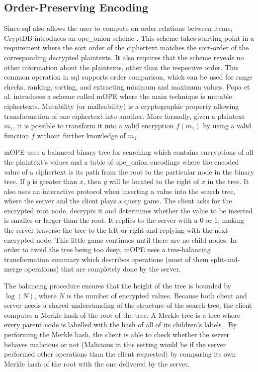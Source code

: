 \subsection{Order-Preserving Encoding}
Since \Gls{sql} also allows the user to compute on order relations between items, CryptDB introduces an \Gls{ope_onion} scheme \citep{CryptDB_Main_Paper}. This scheme takes starting point in a requirement where the sort order of the ciphertext matches the sort-order of the corresponding decrypted plaintexts. It also requires that the scheme reveals no other information about the plaintexts, other than the respective order. This common operation in \Gls{sql} supports order comparison, which can be used for range checks, ranking, sorting, and extracting minimum and maximum values. Popa et al. \cite{CryptDB_OPE_Encoding} introduces a scheme called \Gls{mOPE} where the main technique is mutable ciphertexts. Mutability (or malleability) is a cryptographic property allowing transformation of one ciphertext into another. More formally, given a plaintext $m_1$, it is possible to transform it into a valid encryption $f(m_1)$ by using a valid function $f$ without further knowledge of $m_1$.

\Gls{mOPE} uses a balanced binary tree for searching which contains encryptions of all the plaintext's values and a table of \Gls{ope_onion} encodings where the encoded value of a ciphertext is its path from the root to the particular node in the binary tree. If $y$ is greater than $x$, then $y$ will be located to the right of $x$ in the tree. It also uses an interactive protocol when inserting a value into the search tree, where the server and the client plays a query game. The client asks for the encrypted root node, decrypts it and determines whether the value to be inserted is smaller or larger than the root. It replies to the server with a $0$ or $1$, making the server traverse the tree to the left or right and replying with the next encrypted node. This little game continues until there are no child nodes. In order to avoid the tree being too deep, \Gls{mOPE} uses a tree-balancing transformation summary which describes operations (most of them split-and-merge operations) that are completely done by the server.

The balancing procedure ensures that the height of the tree is bounded by $\log(N)$, where $N$ is the number of encrypted values. Because both client and server needs a shared understanding of the structure of the search tree, the client computes a Merkle hash of the root of the tree. A Merkle tree is a tree where every parent node is labelled with the hash of all of its children's labels \cite{Merkle}. By performing the Merkle hash, the client is able to check whether the server behaves malicious or not (Malicious in this setting would be if the server performed other operations than the client requested) by comparing its own Merkle hash of the root with the one delivered by the server.


